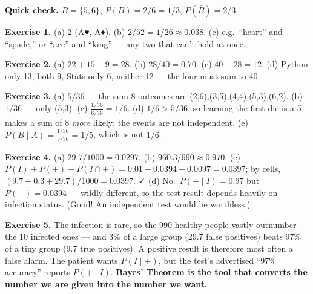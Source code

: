 \documentclass[
]{article}
\begin{document}
\textbf{Quick check.} \(B = \{5,6\}\), \(P(B) = 2/6 = 1/3\),
\(P(\bar{B}) = 2/3\).

\textbf{Exercise 1.} (a) 2 (A♥, A♦). (b) \(2/52 = 1/26 \approx 0.038\).
(c) e.g.~``heart'' and ``spade,'' or ``ace'' and ``king'' --- any two
that can't hold at once.

\textbf{Exercise 2.} (a) \(22 + 15 - 9 = 28\). (b) \(28/40 = 0.70\). (c)
\(40 - 28 = 12\). (d) Python only 13, both 9, Stats only 6, neither 12
--- the four must sum to 40.

\textbf{Exercise 3.} (a) \(5/36\) --- the sum-8 outcomes are
(2,6),(3,5),(4,4),(5,3),(6,2). (b) \(1/36\) --- only (5,3). (c)
\(\frac{1/36}{6/36} = 1/6\). (d) \(1/6 > 5/36\), so learning the first
die is a 5 makes a sum of 8 \emph{more} likely; the events are not
independent. (e) \(P(B \mid A) = \frac{1/36}{5/36} = 1/5\), which is not
\(1/6\).

\textbf{Exercise 4.} (a) \(29.7/1000 = 0.0297\). (b)
\(960.3/990 \approx 0.970\). (c)
\(P(I) + P(+) - P(I \cap +) = 0.01 + 0.0394 - 0.0097 = 0.0397\); by
cells, \((9.7 + 0.3 + 29.7)/1000 = 0.0397\). ✓ (d)
No.~\(P(+ \mid I) = 0.97\) but \(P(+) = 0.0394\) --- wildly different,
so the test result depends heavily on infection status. (Good! An
independent test would be worthless.)

\textbf{Exercise 5.} The infection is rare, so the 990 healthy people
vastly outnumber the 10 infected ones --- and 3\% of a large group (29.7
false positives) beats 97\% of a tiny group (9.7 true positives). A
positive result is therefore most often a false alarm. The patient wants
\(P(I \mid +)\), but the test's advertised ``97\% accuracy'' reports
\(P(+ \mid I)\). \textbf{Bayes' Theorem is the tool that converts the
number we are given into the number we want.}
\end{document}
